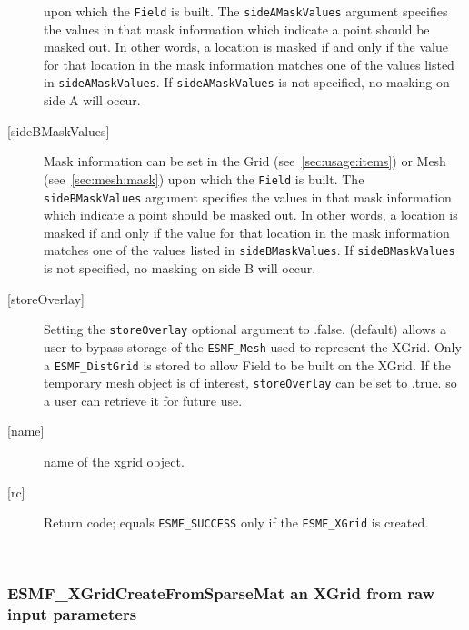 \begin{description}
             upon which the {\tt Field} is built. The {\tt sideAMaskValues} argument specifies the values in that 
             mask information which indicate a point should be masked out. In other words, a location is masked if and only if the
             value for that location in the mask information matches one of the values listed in {\tt sideAMaskValues}.  
             If {\tt sideAMaskValues} is not specified, no masking on side A will occur. 
       \item [{[sideBMaskValues]}]
             Mask information can be set in the Grid (see~\ref{sec:usage:items}) or Mesh (see~\ref{sec:mesh:mask}) 
             upon which the {\tt Field} is built. The {\tt sideBMaskValues} argument specifies the values in that 
             mask information which indicate a point should be masked out. In other words, a location is masked if and only if the
             value for that location in the mask information matches one of the values listed in {\tt sideBMaskValues}.  
             If {\tt sideBMaskValues} is not specified, no masking on side B will occur. 
       \item [{[storeOverlay]}]
             Setting the {\tt storeOverlay} optional argument to .false. (default) 
             allows a user to bypass storage of the {\tt ESMF\_Mesh} used to represent the XGrid.
             Only a {\tt ESMF\_DistGrid} is stored to allow Field to be built on the XGrid.
             If the temporary mesh object is of interest, {\tt storeOverlay} can be set to .true.
             so a user can retrieve it for future use.
       \item [{[name]}]
             name of the xgrid object.
       \item [{[rc]}]
             Return code; equals {\tt ESMF\_SUCCESS} only if the {\tt ESMF\_XGrid} 
             is created.
       \end{description}
   
 
\mbox{}\hrulefill\ 
 
\subsubsection [ESMF\_XGridCreateFromSparseMat] {ESMF\_XGridCreateFromSparseMat an XGrid from raw input parameters}


